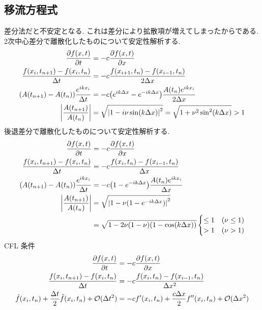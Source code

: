 \documentclass[a4paper,dvipdfmx]{jsarticle}
\theoremstyle{definition}
\begin{document}
\subsection{移流方程式}
差分法だと不安定となる. これは差分により拡散項が増えてしまったからである.
2次中心差分で離散化したものについて安定性解析する.
\begin{align}
  \pdv{f(x, t)}{t}                                    & = -c\pdv{f(x, t)}{x}                                                             \\
  \frac{f(x_i, t_{n+1}) - f(x_i, t_n)}{\Delta t}      & = -c\frac{f(x_{i+1}, t_n) - f(x_{i-1}, t_n)}{2\Delta x}                          \\
  \qty(A(t_{n+1}) - A(t_n))\frac{e^{ikx_i}}{\Delta t} & = -c\qty(e^{ik\Delta x} - e^{-ik\Delta x})\frac{A(t_n)e^{ikx_i}}{2\Delta x}      \\
  \qty|\frac{A(t_{n+1})}{A(t_n)}|                     & = \sqrt{\qty|1 - i\nu\sin(k\Delta x)|^2} = \sqrt{1 + \nu^2\sin^2(k\Delta x)} > 1
\end{align}
後退差分で離散化したものについて安定性解析する.
\begin{align}
  \pdv{f(x, t)}{t}                                    & = -c\pdv{f(x, t)}{x}                                                  \\
  \frac{f(x_i, t_{n+1}) - f(x_i, t_n)}{\Delta t}      & = -c\frac{f(x_i, t_n) - f(x_{i-1}, t_n)}{\Delta x}                    \\
  \qty(A(t_{n+1}) - A(t_n))\frac{e^{ikx_i}}{\Delta t} & = -c\qty(1 - e^{-ik\Delta x})\frac{A(t_n)e^{ikx_i}}{\Delta x}         \\
  \qty|\frac{A(t_{n+1})}{A(t_n)}|                     & = \sqrt{\qty|1 - \nu(1 - e^{-ik\Delta x})|^2}                         \\
                                                      & = \sqrt{1 - 2\nu(1 - \nu)(1 - \cos(k\Delta x))} \begin{cases}
                                                                                                          \leq 1 & (\nu \leq 1) \\
                                                                                                          > 1    & (\nu > 1)    \\
                                                                                                        \end{cases}
\end{align}
CFL 条件
\begin{align}
  \pdv{f(x, t)}{t}                                                                   & = -c\pdv{f(x, t)}{x}                                                          \\
  \frac{f(x_i, t_{n+1}) - f(x_i, t_n)}{\Delta t}                                     & = -c\frac{f(x_i, t_n) - f(x_{i-1}, t_n)}{\Delta x^2}                          \\
  \dot{f}(x_i, t_n) + \frac{\Delta t}{2}\ddot{f}(x_i, t_n) + \mathcal{O}(\Delta t^2) & = -cf'(x_i, t_n) + \frac{c\Delta x}{2}f''(x_i, t_n) + \mathcal{O}(\Delta x^2)
\end{align}
\end{document}

